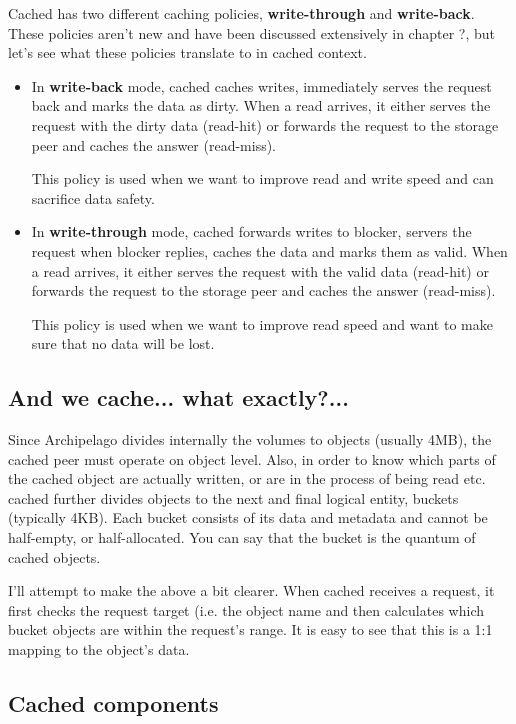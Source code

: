 Cached has two different caching policies, \textbf{write-through} and 
\textbf{write-back}. These policies aren't new and have been discussed 
extensively in chapter ?, but let's see what these policies translate to in 
cached context.

\begin{itemize}
	\item
		In \textbf{write-back} mode, cached caches writes, immediately 
		serves the request back and marks the data as dirty. When a read 
		arrives, it either serves the request with the dirty data 
		(read-hit) or forwards the request to the storage peer and 
		caches the answer (read-miss).

		This policy is used when we want to improve read and write speed 
		and can sacrifice data safety.
	\item
		In \textbf{write-through} mode, cached forwards writes to 
		blocker, servers the request when blocker replies, caches the 
		data and marks them as valid.  When a read arrives, it either 
		serves the request with the valid data (read-hit) or forwards 
		the request to the storage peer and caches the answer 
		(read-miss).

		This policy is used when we want to improve read speed and want 
		to make sure that no data will be lost.
\end{itemize}	

\subsection{And we cache... what exactly?...}

Since Archipelago divides internally the volumes to objects (usually 4MB), the 
cached peer must operate on object level. Also, in order to know which parts of 
the cached object are actually written, or are in the process of being read etc.  
cached further divides objects to the next and final logical entity, buckets 
(typically 4KB). Each bucket consists of its data and metadata and cannot be 
half-empty, or half-allocated. You can say that the bucket is the quantum of 
cached objects.

I'll attempt to make the above a bit clearer. When cached receives a request, it 
first checks the request target (i.e. the object name and then calculates which 
bucket objects are within the request's range. It is easy to see that this is a 
1:1 mapping to the object's data.

\subsection{Cached components}

